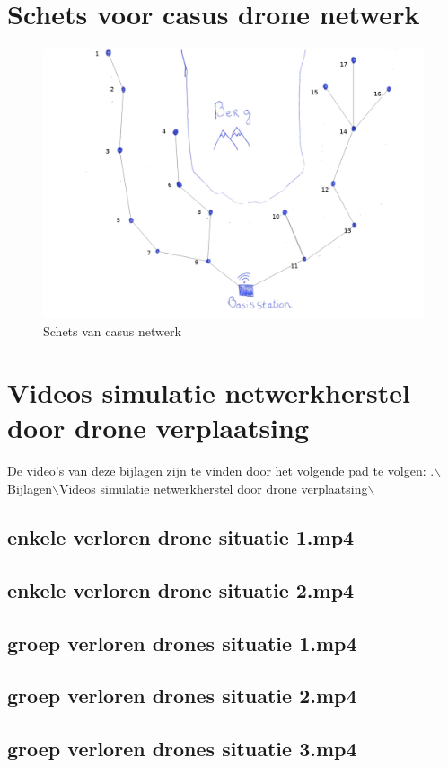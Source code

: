 \documentclass[a4paper, 11pt, oneside]{report}
\begin{document}
\chapter{Schets voor casus drone netwerk}
 \label{app:schetsNetwerk}
\begin{figure}[H]
	\begin{center}\includegraphics[width=\linewidth]{schetsNetwerk}\end{center}
	\caption{Schets van casus netwerk}
	\label{fig:schetsNetwerk}
\end{figure}

\chapter{Videos simulatie netwerkherstel door drone verplaatsing}\label{sec:videos-simulatie-netwerkherstel-door-drone-verplaatsing}
De video's van deze bijlagen zijn te vinden door het volgende pad te volgen: \newline
.$\backslash$Bijlagen$\backslash$Videos simulatie netwerkherstel door drone verplaatsing$\backslash$
\section{enkele verloren drone situatie 1.mp4}\label{sec:enkele-verloren-drone-situatie-1mp4}
\section{enkele verloren drone situatie 2.mp4}\label{sec:enkele-verloren-drone-situatie-2mp4}
\section{groep verloren drones situatie 1.mp4}\label{sec:groep-verloren-drones-situatie-1mp4}
\section{groep verloren drones situatie 2.mp4}\label{sec:groep-verloren-drones-situatie-2mp4}
\section{groep verloren drones situatie 3.mp4}\label{sec:groep-verloren-drones-situatie-3mp4}
\end{document}
